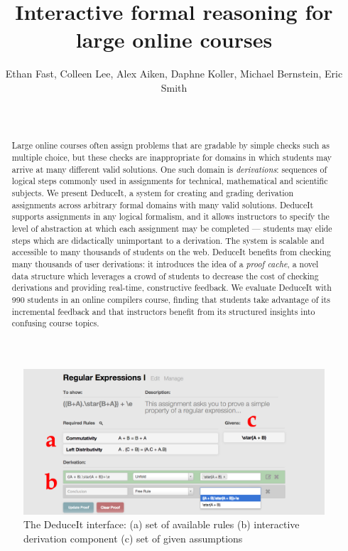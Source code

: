 \documentclass{sigchi}
\begin{document}
\title{Interactive formal reasoning for large online courses}

\author{
  \alignauthor Ethan Fast, Colleen Lee, Alex Aiken, Daphne Koller, Michael Bernstein, Eric Smith\\
    \\
    \\
}

\maketitle

\begin{figure}[ht!]
\centering
\includegraphics[width=1\textwidth]{splash3}
\caption{The DeduceIt interface: (a) set of available rules (b) interactive derivation component (c) set of given assumptions}
\label{fig:splash}
\end{figure}

\begin{abstract}
Large online courses often assign problems that are gradable by simple checks such as multiple choice, but these checks are inappropriate for domains in which students may arrive at many different valid solutions. One such domain is \emph{derivations}: sequences of logical steps commonly used in assignments for technical, mathematical and scientific subjects. We present DeduceIt, a system for creating and grading derivation assignments across arbitrary formal domains with many valid solutions. DeduceIt supports assignments in any logical formalism, and it allows instructors to specify the level of abstraction at which each assignment may be completed --- students may elide steps which are didactically unimportant to a derivation. The system is scalable and accessible to many thousands of students on the web. DeduceIt benefits from checking many thousands of user derivations: it introduces the idea of a \textit{proof cache}, a novel data structure which leverages a crowd of students to decrease the cost of checking derivations and providing real-time, constructive feedback. We evaluate DeduceIt with 990 students in an online compilers course, finding that students take advantage of its incremental feedback and that instructors benefit from its structured insights into confusing course topics.
\end{abstract}
\end{document}
